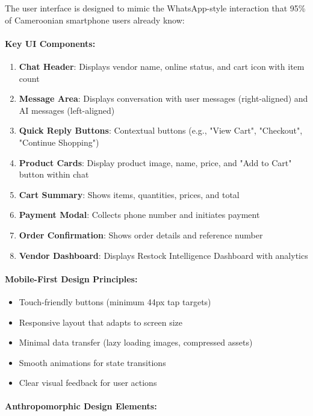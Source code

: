 \documentclass[12pt,a4paper]{article}
\begin{document}
The user interface is designed to mimic the WhatsApp-style interaction that 95\% of Cameroonian smartphone users already know:

\paragraph{Key UI Components:}

\begin{enumerate}
    \item \textbf{Chat Header}: Displays vendor name, online status, and cart icon with item count
    \item \textbf{Message Area}: Displays conversation with user messages (right-aligned) and AI messages (left-aligned)
    \item \textbf{Quick Reply Buttons}: Contextual buttons (e.g., "View Cart", "Checkout", "Continue Shopping")
    \item \textbf{Product Cards}: Display product image, name, price, and "Add to Cart" button within chat
    \item \textbf{Cart Summary}: Shows items, quantities, prices, and total
    \item \textbf{Payment Modal}: Collects phone number and initiates payment
    \item \textbf{Order Confirmation}: Shows order details and reference number
    \item \textbf{Vendor Dashboard}: Displays Restock Intelligence Dashboard with analytics
\end{enumerate}

\paragraph{Mobile-First Design Principles:}

\begin{itemize}
    \item Touch-friendly buttons (minimum 44px tap targets)
    \item Responsive layout that adapts to screen size
    \item Minimal data transfer (lazy loading images, compressed assets)
    \item Smooth animations for state transitions
    \item Clear visual feedback for user actions
\end{itemize}

\paragraph{Anthropomorphic Design Elements:}
\end{document}
